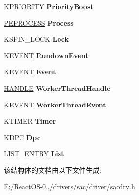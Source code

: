 \begin{DoxyCompactItemize}
K\+P\+R\+I\+O\+R\+I\+TY {\bfseries Priority\+Boost}
\item 
\mbox{\label{struct___s_a_c___d_e_v_i_c_e___e_x_t_e_n_s_i_o_n_a7439d51929007b184ebd511c6849e801}} 
\hyperlink{struct___e_p_r_o_c_e_s_s}{P\+E\+P\+R\+O\+C\+E\+SS} {\bfseries Process}
\item 
\mbox{\label{struct___s_a_c___d_e_v_i_c_e___e_x_t_e_n_s_i_o_n_a14e22cfd2af832924b00acecee5937d0}} 
K\+S\+P\+I\+N\+\_\+\+L\+O\+CK {\bfseries Lock}
\item 
\mbox{\label{struct___s_a_c___d_e_v_i_c_e___e_x_t_e_n_s_i_o_n_a6e7a288fabe2196ecdf1f885c93f2d63}} 
\hyperlink{struct___k_e_v_e_n_t}{K\+E\+V\+E\+NT} {\bfseries Rundown\+Event}
\item 
\mbox{\label{struct___s_a_c___d_e_v_i_c_e___e_x_t_e_n_s_i_o_n_afc3f19025c9daa2c8af4ddc0e8ae66fc}} 
\hyperlink{struct___k_e_v_e_n_t}{K\+E\+V\+E\+NT} {\bfseries Event}
\item 
\mbox{\label{struct___s_a_c___d_e_v_i_c_e___e_x_t_e_n_s_i_o_n_a588aa23c0d921c213bfb9e05396389e3}} 
\hyperlink{interfacevoid}{H\+A\+N\+D\+LE} {\bfseries Worker\+Thread\+Handle}
\item 
\mbox{\label{struct___s_a_c___d_e_v_i_c_e___e_x_t_e_n_s_i_o_n_a8765343063d6cc99de580eb858b3d2eb}} 
\hyperlink{struct___k_e_v_e_n_t}{K\+E\+V\+E\+NT} {\bfseries Worker\+Thread\+Event}
\item 
\mbox{\label{struct___s_a_c___d_e_v_i_c_e___e_x_t_e_n_s_i_o_n_a6fe8cd9eb71f5ff214414fafddee467d}} 
\hyperlink{struct___k_t_i_m_e_r}{K\+T\+I\+M\+ER} {\bfseries Timer}
\item 
\mbox{\label{struct___s_a_c___d_e_v_i_c_e___e_x_t_e_n_s_i_o_n_ad7d5f0c7f07af6c8eaad3f3e31d0ff52}} 
\hyperlink{struct___k_d_p_c}{K\+D\+PC} {\bfseries Dpc}
\item 
\mbox{\label{struct___s_a_c___d_e_v_i_c_e___e_x_t_e_n_s_i_o_n_a29a98fbbced003c6e984eb1116add81c}} 
\hyperlink{struct___l_i_s_t___e_n_t_r_y}{L\+I\+S\+T\+\_\+\+E\+N\+T\+RY} {\bfseries List}
\end{DoxyCompactItemize}


该结构体的文档由以下文件生成\+:\begin{DoxyCompactItemize}
\item 
E\+:/\+React\+O\+S-\/0../drivers/sac/driver/sacdrv.\+h\end{DoxyCompactItemize}
